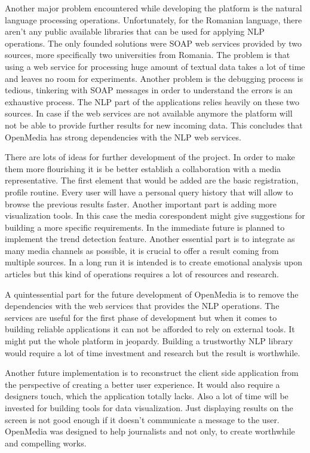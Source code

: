 Another major problem encountered while developing the platform is the natural language processing operations. Unfortunately, for the Romanian language, there aren't any public available libraries that can be used for applying NLP operations. The only founded solutions were SOAP web services provided by two sources, more specifically two universities from Romania. The problem is that using a web service for processing huge amount of textual data takes a lot of time and leaves no room for experiments. Another problem is the debugging process is tedious, tinkering with SOAP messages in order to understand the errors is an exhaustive process. The NLP part of the applications relies heavily on these two sources. In case if the web services are not available anymore the platform will not be able to provide further results for new incoming data. This concludes that OpenMedia has strong dependencies with the NLP web services.

There are lots of ideas for further development of the project. In order to make them more flourishing it is be better establish a collaboration with a media representative. The first element that would be added are the basic registration, profile routine. Every user will have a personal query history that will allow to browse the previous results faster. Another important part is adding more visualization tools. In this case the media corespondent might give suggestions for building a more specific requirements. In the immediate future is planned to implement the trend detection feature. Another essential part is to integrate as many media channels as possible, it is crucial to offer a result coming from multiple sources. In a long run it is intended is to create emotional analysis upon articles but this kind of operations requires a lot of resources and research.

A quintessential part for the future development of OpenMedia is to remove the dependencies with the web services that provides the NLP operations. The services are useful for the first phase of development but when it comes to building reliable applications it can not be afforded to rely on external tools. It might put the whole platform in jeopardy. Building a trustworthy NLP library would require a lot of time investment and research but the result is worthwhile.

Another future implementation is to reconstruct the client side application from the perspective of creating a better user experience. It would also require a designers touch, which the application totally lacks. Also a lot of time will be invested for building tools for data visualization. Just displaying results on the screen is not good enough if it doesn't communicate a message to the user. OpenMedia was designed to help journalists and not only, to create worthwhile and compelling works.
\clearpage